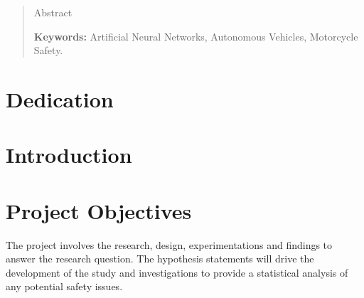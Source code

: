 \documentclass[12pt]{report} %
\begin{document}
\renewcommand\abstractname{\large\bfseries\filcenter\uppercase{Summary}}
\begin{abstract}
	\thispagestyle{plain}
	\setcounter{page}{3}

	Abstract

	\textbf{Keywords:} %
	Artificial Neural Networks, Autonomous Vehicles, Motorcycle Safety.
	\vfill
\end{abstract}
\newpage %
\thispagestyle{empty}
\mbox{}
\chapter*{Dedication}

\setcounter{page}{5}

\vfill

\newpage %
\thispagestyle{empty}
\mbox{}



\tableofcontents
\thispagestyle{fancy}

\newpage %
\thispagestyle{empty}
\mbox{}

\listoffigures
\thispagestyle{fancy}

\newpage %
\thispagestyle{empty}
\mbox{}

\listoftables
\thispagestyle{fancy}

\newpage %
\thispagestyle{empty}
\mbox{}


\clearpage
{} %

\chapter{Introduction}

\chapter{Project Objectives}
\label{chap:projectObjectives}
	
	The project involves the research, design, experimentations and findings to answer the research question. The hypothesis statements will drive the development of the study and investigations to provide a statistical analysis of any potential safety issues.
\end{document}

